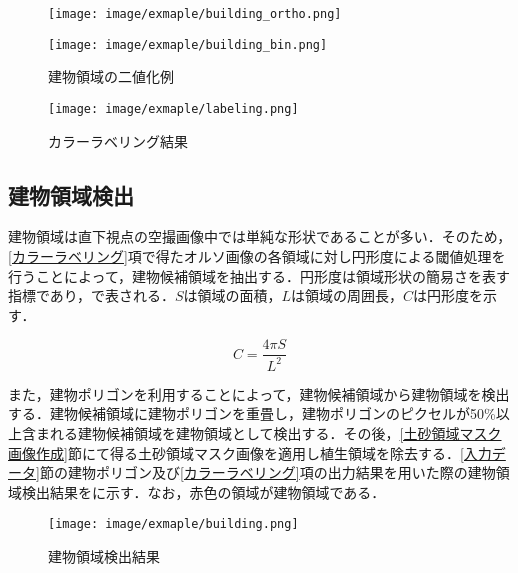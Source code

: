       \begin{figure}[tbp]
        \begin{minipage}[c]{0.5\hsize}
          \centering
          \texttt{[image: image/exmaple/building\_ortho.png]}
        \end{minipage}
        \begin{minipage}[c]{0.45\hsize}
          \centering
          \texttt{[image: image/exmaple/building\_bin.png]}
        \end{minipage}
        \caption{建物領域の二値化例}
        \label{建物領域の二値化例}
      \end{figure}

      \begin{figure}[tbp]
        \centering
        \texttt{[image: image/exmaple/labeling.png]}
        \caption{カラーラベリング結果}
        \label{カラーラベリング結果}
      \end{figure}


    \subsection{建物領域検出}
      \label{建物領域検出}
      建物領域は直下視点の空撮画像中では単純な形状であることが多い．そのため，\ref{カラーラベリング}項で得たオルソ画像の各領域に対し円形度による閾値処理を行うことによって，建物候補領域を抽出する．円形度は領域形状の簡易さを表す指標であり，で表される．$S$は領域の面積，$L$は領域の周囲長，$C$は円形度を示す．

      \begin{equation}
        \label{円形度}
        C = \dfrac{4 \pi S} {L^2} 
      \end{equation}

      また，建物ポリゴンを利用することによって，建物候補領域から建物領域を検出する．建物候補領域に建物ポリゴンを重畳し，建物ポリゴンのピクセルが50\%以上含まれる建物候補領域を建物領域として検出する．その後，\ref{土砂領域マスク画像作成}節にて得る土砂領域マスク画像を適用し植生領域を除去する．\ref{入力データ}節の建物ポリゴン及び\ref{カラーラベリング}項の出力結果を用いた際の建物領域検出結果をに示す．なお，赤色の領域が建物領域である．
      
      \begin{figure}[tbp]
        \centering
        \texttt{[image: image/exmaple/building.png]}
        \caption{建物領域検出結果}
        \label{建物領域検出結果}
      \end{figure}



